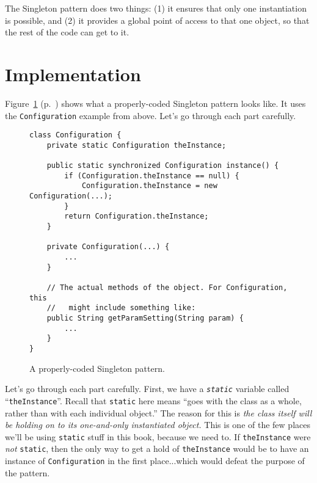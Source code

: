 The Singleton pattern does two things: (1) it ensures that only one
instantiation is possible, and (2) it provides a global point of access to
that one object, so that the rest of the code can get to it.

\section{Implementation}

Figure~\ref{fig:singletonCode} (p.~\pageref{fig:singletonCode}) shows what a
properly-coded Singleton pattern looks like. It uses the \texttt{Configuration}
example from above. Let's go through each part carefully.

\begin{figure}[ht]
\centering
\begin{Verbatim}[fontsize=\footnotesize,samepage=true,frame=single]
class Configuration {
    private static Configuration theInstance;
    
    public static synchronized Configuration instance() {
        if (Configuration.theInstance == null) {
            Configuration.theInstance = new Configuration(...);
        }
        return Configuration.theInstance;
    }

    private Configuration(...) {
        ...
    }

    // The actual methods of the object. For Configuration, this
    //   might include something like:
    public String getParamSetting(String param) {
        ...
    }
}
\end{Verbatim}
\caption{A properly-coded Singleton pattern.}
\label{fig:singletonCode}
\end{figure}


Let's go through each part carefully. First, we have a
\textit{\texttt{static}} variable called ``\texttt{theInstance}''. Recall that
\texttt{static} here means ``goes with the class as a whole, rather than with
each individual object.'' The reason for this is \textit{the class itself will
be holding on to its one-and-only instantiated object.} This is one of the few
places we'll be using \texttt{static} stuff in this book, because we need to.
If \texttt{theInstance} were \textit{not} \texttt{static}, then the only way
to get a hold of \texttt{theInstance} would be to have an instance of
\texttt{Configuration} in the first place...which would defeat the purpose of
the pattern.

